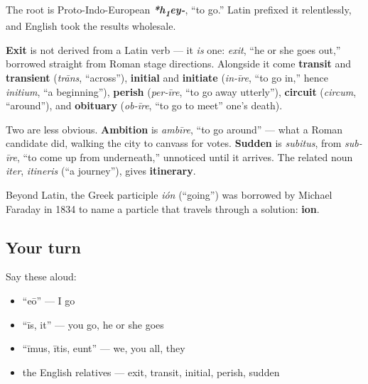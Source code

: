 \begin{cousinweb}
The root is Proto-Indo-European \emph{\textbf{*h\textsubscript{1}ey-}}, \textquotedblleft{}to go.\textquotedblright{} Latin prefixed it relentlessly, and English took the results wholesale.

\textbf{Exit} is not derived from a Latin verb — it \emph{is} one: \emph{exit}, \textquotedblleft{}he or she goes out,\textquotedblright{} borrowed straight from Roman stage directions. Alongside it come \textbf{transit} and \textbf{transient} (\emph{trāns}, \textquotedblleft{}across\textquotedblright{}), \textbf{initial} and \textbf{initiate} (\emph{in-īre}, \textquotedblleft{}to go in,\textquotedblright{} hence \emph{initium}, \textquotedblleft{}a beginning\textquotedblright{}), \textbf{perish} (\emph{per-īre}, \textquotedblleft{}to go away utterly\textquotedblright{}), \textbf{circuit} (\emph{circum}, \textquotedblleft{}around\textquotedblright{}), and \textbf{obituary} (\emph{ob-īre}, \textquotedblleft{}to go to meet\textquotedblright{} one's death).

Two are less obvious. \textbf{Ambition} is \emph{ambīre}, \textquotedblleft{}to go around\textquotedblright{} — what a Roman candidate did, walking the city to canvass for votes. \textbf{Sudden} is \emph{subitus}, from \emph{sub-īre}, \textquotedblleft{}to come up from underneath,\textquotedblright{} unnoticed until it arrives. The related noun \emph{iter}, \emph{itineris} (\textquotedblleft{}a journey\textquotedblright{}), gives \textbf{itinerary}.

Beyond Latin, the Greek participle \emph{ión} (\textquotedblleft{}going\textquotedblright{}) was borrowed by Michael Faraday in 1834 to name a particle that travels through a solution: \textbf{ion}.
\end{cousinweb}

\subsection*{Your turn}
Say these aloud:

\begin{itemize}
\raggedright
  \item \textquotedblleft{}eō\textquotedblright{} — I go
  \item \textquotedblleft{}īs, it\textquotedblright{} — you go, he or she goes
  \item \textquotedblleft{}īmus, ītis, eunt\textquotedblright{} — we, you all, they
  \item the English relatives — exit, transit, initial, perish, sudden
\end{itemize}

